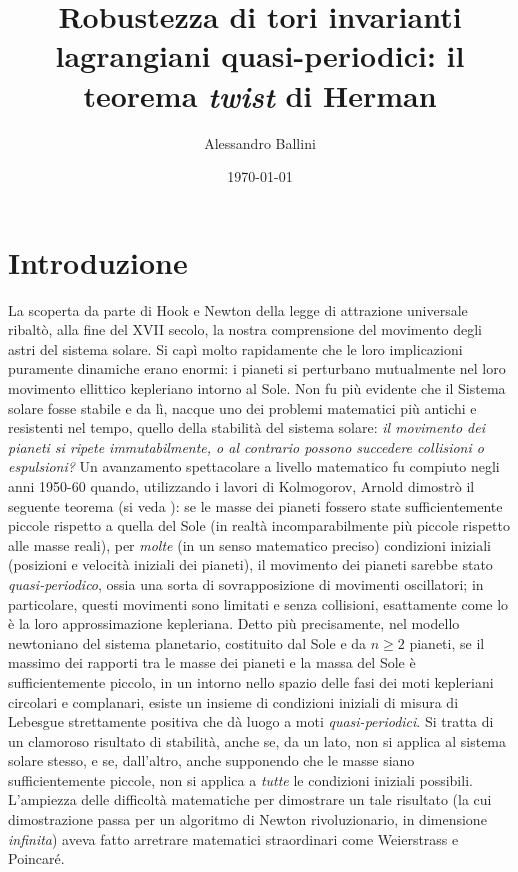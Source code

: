 \documentclass[twoside, 11pt]{amsbook}
\newcommand{\0}{{(0)}}
\newcommand{\3}{{(3)}}
\theoremstyle{colonplain}
\theoremstyle{colondefinition}
\theoremstyle{colonremark}
\numberwithin{equation}{chapter}
\begin{document}
\date{\today}
\author{Alessandro Ballini}


\title{Robustezza di tori invarianti lagrangiani quasi-periodici: il teorema \textit{twist} di Herman}


\maketitle
\tableofcontents

\chapter*{Introduzione}
La scoperta da parte di Hook e Newton della legge di attrazione universale ribaltò, alla fine del XVII secolo, la nostra comprensione del movimento degli astri del sistema solare. Si capì molto rapidamente che le loro implicazioni puramente dinamiche erano enormi: i pianeti si perturbano mutualmente nel loro movimento ellittico kepleriano intorno al Sole. Non fu più evidente che il Sistema solare fosse stabile e da lì, nacque uno dei problemi matematici più antichi e resistenti nel tempo, quello della stabilità del sistema solare: \textit{il movimento dei pianeti si ripete immutabilmente, o al contrario possono succedere collisioni o espulsioni? } 
Un avanzamento spettacolare a livello matematico fu compiuto negli anni 1950-60 quando, utilizzando i lavori di Kolmogorov, Arnold dimostrò il seguente teorema (si veda \cite{Arn63}): se le masse dei pianeti fossero state sufficientemente piccole rispetto a quella del Sole (in realtà incomparabilmente più piccole rispetto alle masse reali), per \textit{molte} (in un senso matematico preciso) condizioni iniziali (posizioni e velocità iniziali dei pianeti), il movimento dei pianeti sarebbe stato \textit{quasi-periodico}, ossia una sorta di sovrapposizione di movimenti oscillatori; in particolare, questi movimenti sono limitati e senza collisioni, esattamente come lo è la loro approssimazione kepleriana.  Detto più precisamente, nel modello newtoniano del sistema planetario, costituito dal Sole e da $n \geq 2$ pianeti, se il massimo dei rapporti tra le masse dei pianeti e la massa del Sole è sufficientemente piccolo, in un intorno nello spazio delle fasi dei moti kepleriani circolari e complanari, esiste un insieme di condizioni iniziali di misura di Lebesgue strettamente positiva che dà luogo a moti \textit{quasi-periodici}. Si tratta di un clamoroso risultato di stabilità, anche se, da un lato, non si applica al sistema solare stesso, e se, dall'altro, anche supponendo che le masse siano sufficientemente piccole, non si applica a \textit{tutte} le condizioni iniziali possibili. L'ampiezza delle difficoltà matematiche per dimostrare un tale risultato (la cui dimostrazione passa per un algoritmo di Newton rivoluzionario, in dimensione \emph{infinita}) aveva fatto arretrare matematici straordinari come Weierstrass e Poincaré. 
\end{document}
